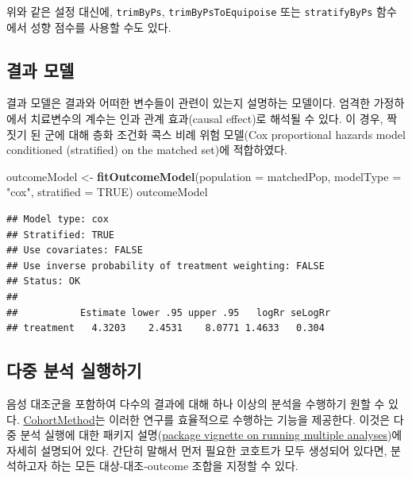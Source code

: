 \documentclass[11pt]{book}
\newenvironment{Shaded}{\begin{snugshade}}{\end{snugshade}}
\newcommand{\KeywordTok}[1]{\textcolor[rgb]{0.13,0.29,0.53}{\textbf{#1}}}
\newcommand{\DataTypeTok}[1]{\textcolor[rgb]{0.13,0.29,0.53}{#1}}
\newcommand{\StringTok}[1]{\textcolor[rgb]{0.31,0.60,0.02}{#1}}
\newcommand{\OtherTok}[1]{\textcolor[rgb]{0.56,0.35,0.01}{#1}}
\newcommand{\NormalTok}[1]{#1}
\theoremstyle{definition}
\theoremstyle{definition}
\theoremstyle{definition}
\theoremstyle{remark}
\begin{document}
위와 같은 설정 대신에, \texttt{trimByPs}, \texttt{trimByPsToEquipoise}
또는 \texttt{stratifyByPs} 함수에서 성향 점수를 사용할 수도 있다.

\subsection{결과 모델}\label{-}

결과 모델은 결과와 어떠한 변수들이 관련이 있는지 설명하는 모델이다.
엄격한 가정하에서 치료변수의 계수는 인과 관계 효과(causal effect)로
해석될 수 있다. 이 경우, 짝짓기 된 군에 대해 층화 조건화 콕스 비례 위험
모델(Cox proportional hazards model conditioned (stratified) on the
matched set)에 적합하였다.

\begin{Shaded}
\begin{Highlighting}[]
\NormalTok{outcomeModel <-}\StringTok{ }\KeywordTok{fitOutcomeModel}\NormalTok{(}\DataTypeTok{population =}\NormalTok{ matchedPop,}
                                \DataTypeTok{modelType =} \StringTok{"cox"}\NormalTok{,}
                                \DataTypeTok{stratified =} \OtherTok{TRUE}\NormalTok{)}
\NormalTok{outcomeModel}
\end{Highlighting}
\end{Shaded}

\begin{verbatim}
## Model type: cox
## Stratified: TRUE
## Use covariates: FALSE
## Use inverse probability of treatment weighting: FALSE
## Status: OK
## 
##           Estimate lower .95 upper .95   logRr seLogRr
## treatment   4.3203    2.4531    8.0771 1.4633   0.304
\end{verbatim}

\subsection{다중 분석 실행하기}\label{MultipleAnalyses}

음성 대조군을 포함하여 다수의 결과에 대해 하나 이상의 분석을 수행하기
원할 수 있다.
\href{https://ohdsi.github.io/CohortMethod/}{CohortMethod}는 이러한
연구를 효율적으로 수행하는 기능을 제공한다. 이것은 다중 분석 실행에 대한
패키지
설명(\href{https://ohdsi.github.io/CohortMethod/articles/MultipleAnalyses.html}{package
vignette on running multiple analyses})에 자세히 설명되어 있다. 간단히
말해서 먼저 필요한 코호트가 모두 생성되어 있다면, 분석하고자 하는 모든
대상-대조-outcome 조합을 지정할 수 있다.
\end{document}
